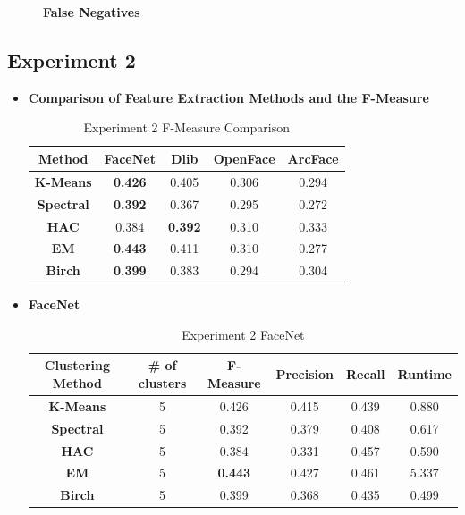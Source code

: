 \documentclass[12pt,english]{article}
\begin{document}
\begin{figure}[H]
\begin{minipage}[b]{0.4\textwidth}
    \caption{\textbf{False Negatives}}
    \label{fig:ex1fn}
  \end{minipage}
\end{figure}

\subsection{Experiment 2}

\begin{itemize}
\item \textbf{Comparison of Feature Extraction Methods and the F-Measure}
\begin{table}[H]
\centering
\begin{tabular}{||c c c c c||} 
 \hline
Method & FaceNet & Dlib & OpenFace & ArcFace\\ [0.5ex]
 \hline\hline
 \textbf{K-Means} & \textbf{0.426} & 0.405 & 0.306 & 0.294\\ 
 \hline
  \textbf{Spectral} & \textbf{0.392} & 0.367 & 0.295 & 0.272\\
 \hline
 \textbf{HAC} & 0.384 & \textbf{0.392} & 0.310 & 0.333\\
 \hline
 \textbf{EM} & \textbf{0.443} & 0.411 & 0.310 & 0.277\\
 \hline
 \textbf{Birch} & \textbf{0.399} & 0.383 & 0.294 & 0.304\\
 \hline
\end{tabular}
\caption{Experiment 2 F-Measure Comparison}
\label{table:ex2}
\end{table}
\item \textbf{FaceNet}
\begin{table}[H]
\centering
\begin{tabular}{||c c c c c c||} 
 \hline
 Clustering Method & \# of clusters & F-Measure & Precision & Recall & Runtime\\ [0.5ex]
 \hline\hline
 \textbf{K-Means} & 5 & 0.426 & 0.415 & 0.439 & 0.880\\ 
 \hline
  \textbf{Spectral} & 5 & 0.392 & 0.379 & 0.408 & 0.617\\
 \hline
 \textbf{HAC} & 5 & 0.384 & 0.331 & 0.457 & 0.590\\
 \hline
 \textbf{EM} & 5 & \textbf{0.443} & 0.427 & 0.461 & 5.337\\
 \hline
 \textbf{Birch} & 5 & 0.399 & 0.368 & 0.435 & 0.499\\
 \hline
\end{tabular}
\caption{Experiment 2 FaceNet}
\label{table:ex2facenet}
\end{table}


\end{itemize}
\end{document}
